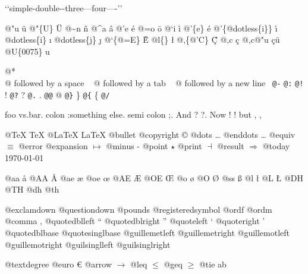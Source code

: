 \documentclass{book}
\begin{document}
\begin{titlepage}
`\hbox{}`simple-double-\hbox{}-three---four----'\hbox{}'\leavevmode{}\\

%
%
%
%

@"u \"{u} 
@"\{U\} \"{U} 
@\~{}n \~{n}
@\^{}a \^{a}
@'e \'{e}
@=o \={o}
@`i \`{i}
@'\{e\} \'{e}
@'\{@dotless\{i\}\} \'{\i{}} 
@dotless\{i\} \i{}
@dotless\{j\} \j{}
@`\{@=E\} \`{\={E}} 
@l\{\} \l{}
@,\{@'C\} \c{\'{C}}
@,c \c{c}
@,c@"u \c{c}\"{u} \leavevmode{}\\

@U\{0075\} u

@* \leavevmode{}\\
@ followed by a space
\ {}
@ followed by a tab
\ {}
@ followed by a new line
\ {}\texttt{@-} \-{}
\texttt{@:} \@
\texttt{@!} \@!
\texttt{@?} \@?
\texttt{@.} \@.
\texttt{@@} @
\texttt{@\}} \}
\texttt{@\{} \{
\texttt{@/} 

foo vs.\@ bar. 
colon :\@And something else.
semi colon ;\@.
And ? ?\@.
Now ! !\@@
but , ,\@

@TeX \TeX{}
@LaTeX \LaTeX{}
@bullet \textbullet{}
@copyright \copyright{}
@dots \dots{}\@
@enddots \dots{}
@equiv $\equiv{}$
@error 
@expansion $\mapsto{}$
@minus -
@point $\star{}$
@print $\dashv{}$
@result $\Rightarrow{}$
@today \today{}

@aa \aa{}
@AA \AA{}
@ae \ae{}
@oe \oe{}
@AE \AE{}
@OE \OE{}
@o \o{}
@O \O{}
@ss \ss{}
@l \l{}
@L \L{}
@DH \DH{}
@TH \TH{}
@dh \dh{}
@th \th{}

@exclamdown \textexclamdown{}
@questiondown \textquestiondown{}
@pounds \textsterling{}
@registeredsymbol \circledR{}
@ordf \textordfeminine{}
@ordm \textordmasculine{}
@comma ,
@quotedblleft \textquotedblleft{}
@quotedblright \textquotedblright{}
@quoteleft \textquoteleft{}
@quoteright \textquoteright{}
@quotedblbase \quotedblbase{}
@quotesinglbase \quotesinglbase{}
@guillemetleft \guillemotleft{}
@guillemetright \guillemotright{}
@guillemotleft \guillemotleft{}
@guillemotright \guillemotright{}
@guilsinglleft \guilsinglleft{}
@guilsinglright \guilsinglright{}

@textdegree \textdegree{}
@euro \euro{}
@arrow $\rightarrow{}$
@leq $\leq{}$
@geq $\geq{}$
@tie a\hbox{}b


\end{titlepage}
\end{document}

